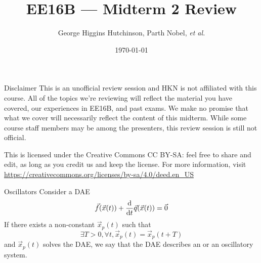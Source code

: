 \documentclass{beamer}
\title{EE16B --- Midterm 2 Review}
\author{George Higgins Hutchinson, Parth Nobel, \textit{et al.}}
\date{\today}
\begin{document}
	\begin{frame}
		\titlepage
	\end{frame}

	\begin{frame}{Disclaimer}
	This is an unofficial review session and HKN is not affiliated with this course. All of the topics we're reviewing will reflect the material you have covered, our experiences in EE16B, and past exams. We make no promise that what we cover will necessarily reflect the content of this midterm. While some course staff members may be among the presenters, this review session is still not official.
	\vspace{1em}
	
	This is licensed under the Creative Commons CC BY-SA: feel free to share and edit, as long as you credit us and keep the license. For more information, visit \\ \small{\url{https://creativecommons.org/licenses/by-sa/4.0/deed.en_US}}
	
	\end{frame}

    \begin{frame}{Oscillators}
        Consider a DAE \[
            \vec f(\vec x(t)) + \ddt{} \vec q(\vec x(t)) = \vec 0
        \]
        If there exists a non-constant \(\vec x_p(t)\) such that \[
            \exists T> 0,\forall t, \vec x_p(t) = \vec x_p(t + T)
        \] and \(\vec x_p(t)\) solves the DAE, we say that the DAE describes an  or an oscillatory system.
    \end{frame}
\end{document}
